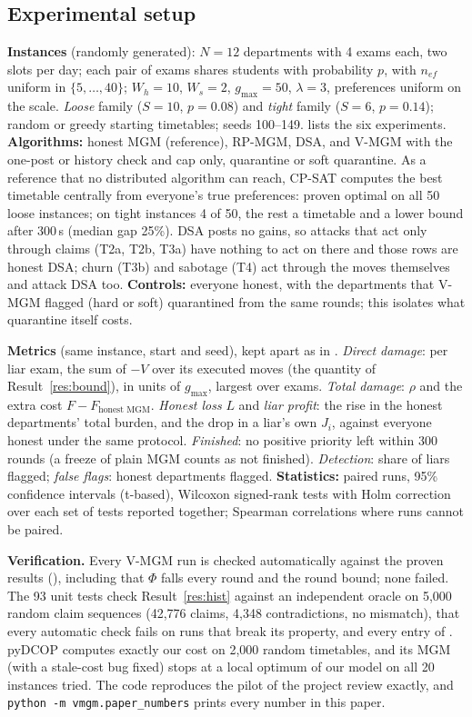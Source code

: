 \documentclass{article}
\theoremstyle{definition}
\newcommand{\1}{\mathbf{1}}
\newcommand{\gmax}{g_{\max}}
\begin{document}
\subsection{Experimental setup}
\label{sec:setup}
\textbf{Instances} (randomly generated): $N=12$ departments with 4 exams each, two slots per day; each pair of exams shares students with probability $p$, with $n_{ef}$ uniform in $\{5,\dots,40\}$; $W_h=10$, $W_s=2$, $\gmax=50$, $\lambda=3$, preferences uniform on the scale. \emph{Loose} family ($S=10$, $p=0.08$) and \emph{tight} family ($S=6$, $p=0.14$); random or greedy starting timetables; seeds 100--149.  lists the six experiments. \textbf{Algorithms:} honest MGM (reference), RP-MGM, DSA, and V-MGM with the one-post or history check and cap only, quarantine or soft quarantine. As a reference that no distributed algorithm can reach, CP-SAT \citep{ortools} computes the best timetable centrally from everyone's true preferences: proven optimal on all 50 loose instances; on tight instances 4 of 50, the rest a timetable and a lower bound after 300\,s (median gap 25\%). DSA posts no gains, so attacks that act only through claims (T2a, T2b, T3a) have nothing to act on there and those rows are honest DSA; churn (T3b) and sabotage (T4) act through the moves themselves and attack DSA too. \textbf{Controls:} everyone honest, with the departments that V-MGM flagged (hard or soft) quarantined from the same rounds; this isolates what quarantine itself costs.

\textbf{Metrics} (same instance, start and seed), kept apart as in . \emph{Direct damage}: per liar exam, the sum of $-V$ over its executed moves (the quantity of Result~\ref{res:bound}), in units of $\gmax$, largest over exams. \emph{Total damage}: $\rho$ and the extra cost $F-F_{\text{honest MGM}}$. \emph{Honest loss} $L$ and \emph{liar profit}: the rise in the honest departments' total burden, and the drop in a liar's own $J_i$, against everyone honest under the same protocol. \emph{Finished}: no positive priority left within 300 rounds (a freeze of plain MGM counts as not finished). \emph{Detection}: share of liars flagged; \emph{false flags}: honest departments flagged. \textbf{Statistics:} paired runs, 95\% confidence intervals (t-based), Wilcoxon signed-rank tests with Holm correction over each set of tests reported together; Spearman correlations where runs cannot be paired.

\textbf{Verification.} Every V-MGM run is checked automatically against the proven results (), including that $\Phi$ falls every round and the round bound; none failed. The 93 unit tests check Result~\ref{res:hist} against an independent oracle on 5{,}000 random claim sequences (42{,}776 claims, 4{,}348 contradictions, no mismatch), that every automatic check fails on runs that break its property, and every entry of . pyDCOP \citep{rust2019pydcop} computes exactly our cost on 2{,}000 random timetables, and its MGM (with a stale-cost bug fixed) stops at a local optimum of our model on all 20 instances tried. The code reproduces the pilot of the project review exactly, and \texttt{python -m vmgm.paper\_numbers} prints every number in this paper.
\end{document}
